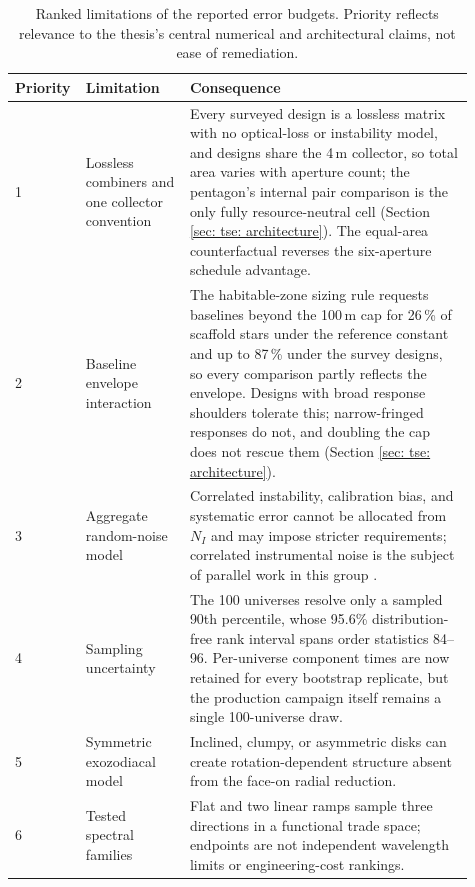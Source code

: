 \documentclass[12pt,a4paper]{article}
\numberwithin{equation}{section}
\numberwithin{figure}{section}
\numberwithin{table}{section}
\begin{document}
\begin{table}[htbp]
\centering
\small
\begin{tabular}{@{}p{0.09\linewidth}p{0.22\linewidth}p{0.60\linewidth}@{}}
\toprule
Priority & Limitation & Consequence \\
\midrule
1 & Lossless combiners and one collector convention & Every surveyed design is a lossless matrix with no optical-loss or instability model, and designs share the 4\,m collector, so total area varies with aperture count; the pentagon's internal pair comparison is the only fully resource-neutral cell (Section \ref{sec: tse: architecture}). The equal-area counterfactual reverses the six-aperture schedule advantage. \\
2 & Baseline envelope interaction & The habitable-zone sizing rule requests baselines beyond the 100\,m cap for 26\,\% of scaffold stars under the reference constant and up to 87\,\% under the survey designs, so every comparison partly reflects the envelope. Designs with broad response shoulders tolerate this; narrow-fringed responses do not, and doubling the cap does not rescue them (Section \ref{sec: tse: architecture}). \\
3 & Aggregate random-noise model & Correlated instability, calibration bias, and systematic error cannot be allocated from $N_I$ and may impose stricter requirements; correlated instrumental noise is the subject of parallel work in this group \cite{huber2024noise}. \\
4 & Sampling uncertainty & The 100 universes resolve only a sampled 90th percentile, whose 95.6\% distribution-free rank interval spans order statistics 84--96. Per-universe component times are now retained for every bootstrap replicate, but the production campaign itself remains a single 100-universe draw. \\
5 & Symmetric exozodiacal model & Inclined, clumpy, or asymmetric disks can create rotation-dependent structure absent from the face-on radial reduction. \\
6 & Tested spectral families & Flat and two linear ramps sample three directions in a functional trade space; endpoints are not independent wavelength limits or engineering-cost rankings. \\
\bottomrule
\end{tabular}
\caption{Ranked limitations of the reported error budgets. Priority reflects relevance to the thesis's central numerical and architectural claims, not ease of remediation.}
\label{tab: ranked limitations}
\end{table}
\end{document}
